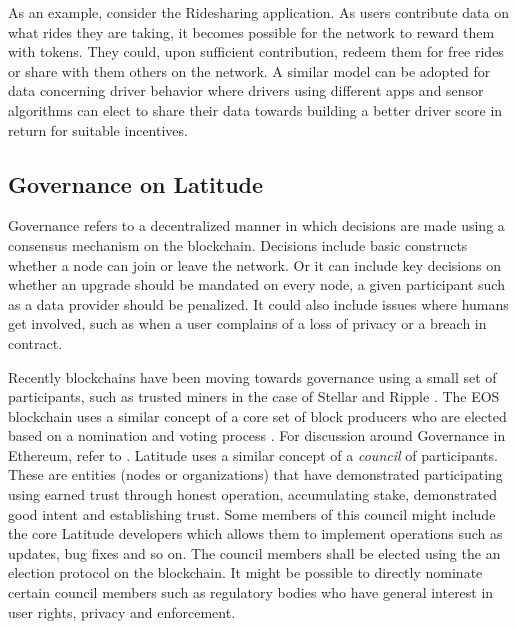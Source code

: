 As an example, consider the Ridesharing application. As users contribute data on what rides they are taking, it becomes
possible for the network to reward them with tokens. They could, upon sufficient contribution, redeem them for free
rides or share with them others on the network. A similar model can be adopted for data concerning driver behavior where
drivers using different apps and sensor algorithms can elect to share their data towards building a better driver score
in return for suitable incentives.

\subsection{Governance on Latitude}

Governance refers to a decentralized manner in which decisions are made using a consensus mechanism on the blockchain.
Decisions include basic constructs whether a node can join or leave the network. Or it can include key decisions on
whether an upgrade should be mandated on every node, a given participant such as a data provider should be penalized. It
could also include issues where humans get involved, such as when a user complains of a loss of privacy or a breach in
contract.

Recently blockchains have been moving towards governance using a small set of participants, such as trusted miners in
the case of Stellar and Ripple \cite{stellar_gateway}. The EOS blockchain uses a similar concept of a core set of block
producers who are elected based on a nomination and voting process \cite{eos_producers}. For discussion around
Governance in Ethereum, refer to \cite{buterin_gov}. Latitude uses a similar concept of a {\em council} of participants.
These are entities (nodes or organizations) that have demonstrated participating using earned trust through honest
operation, accumulating stake, demonstrated good intent and establishing trust. Some members of this council might
include the core Latitude developers which allows them to implement operations such as updates, bug fixes and so on. The
council members shall be elected using the an election protocol on the blockchain. It might be possible to directly
nominate certain council members such as regulatory bodies who have general interest in user rights, privacy and
enforcement. 

%

